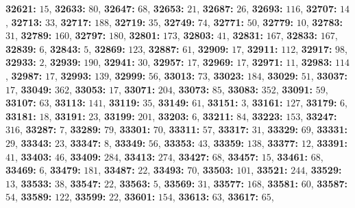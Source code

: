 \textsf{\bfseries 32621:} $15$, \textsf{\bfseries 32633:} $80$, \textsf{\bfseries 32647:} $68$, \textsf{\bfseries 32653:} $21$, \textsf{\bfseries 32687:} $26$, \textsf{\bfseries 32693:} $116$, \textsf{\bfseries 32707:} $14$, \textsf{\bfseries 32713:} $33$, \textsf{\bfseries 32717:} $188$, \textsf{\bfseries 32719:} $35$, \textsf{\bfseries 32749:} $74$, \textsf{\bfseries 32771:} $50$, \textsf{\bfseries 32779:} $10$, \textsf{\bfseries 32783:} $31$, \textsf{\bfseries 32789:} $160$, \textsf{\bfseries 32797:} $180$, \textsf{\bfseries 32801:} $173$, \textsf{\bfseries 32803:} $41$, \textsf{\bfseries 32831:} $167$, \textsf{\bfseries 32833:} $167$, \textsf{\bfseries 32839:} $6$, \textsf{\bfseries 32843:} $5$, \textsf{\bfseries 32869:} $123$, \textsf{\bfseries 32887:} $61$, \textsf{\bfseries 32909:} $17$, \textsf{\bfseries 32911:} $112$, \textsf{\bfseries 32917:} $98$, \textsf{\bfseries 32933:} $2$, \textsf{\bfseries 32939:} $190$, \textsf{\bfseries 32941:} $30$, \textsf{\bfseries 32957:} $17$, \textsf{\bfseries 32969:} $17$, \textsf{\bfseries 32971:} $11$, \textsf{\bfseries 32983:} $114$, \textsf{\bfseries 32987:} $17$, \textsf{\bfseries 32993:} $139$, \textsf{\bfseries 32999:} $56$, \textsf{\bfseries 33013:} $73$, \textsf{\bfseries 33023:} $184$, \textsf{\bfseries 33029:} $51$, \textsf{\bfseries 33037:} $17$, \textsf{\bfseries 33049:} $362$, \textsf{\bfseries 33053:} $17$, \textsf{\bfseries 33071:} $204$, \textsf{\bfseries 33073:} $85$, \textsf{\bfseries 33083:} $352$, \textsf{\bfseries 33091:} $59$, \textsf{\bfseries 33107:} $63$, \textsf{\bfseries 33113:} $141$, \textsf{\bfseries 33119:} $35$, \textsf{\bfseries 33149:} $61$, \textsf{\bfseries 33151:} $3$, \textsf{\bfseries 33161:} $127$, \textsf{\bfseries 33179:} $6$, \textsf{\bfseries 33181:} $18$, \textsf{\bfseries 33191:} $23$, \textsf{\bfseries 33199:} $201$, \textsf{\bfseries 33203:} $6$, \textsf{\bfseries 33211:} $84$, \textsf{\bfseries 33223:} $153$, \textsf{\bfseries 33247:} $316$, \textsf{\bfseries 33287:} $7$, \textsf{\bfseries 33289:} $79$, \textsf{\bfseries 33301:} $70$, \textsf{\bfseries 33311:} $57$, \textsf{\bfseries 33317:} $31$, \textsf{\bfseries 33329:} $69$, \textsf{\bfseries 33331:} $29$, \textsf{\bfseries 33343:} $23$, \textsf{\bfseries 33347:} $8$, \textsf{\bfseries 33349:} $56$, \textsf{\bfseries 33353:} $43$, \textsf{\bfseries 33359:} $138$, \textsf{\bfseries 33377:} $12$, \textsf{\bfseries 33391:} $41$, \textsf{\bfseries 33403:} $46$, \textsf{\bfseries 33409:} $284$, \textsf{\bfseries 33413:} $274$, \textsf{\bfseries 33427:} $68$, \textsf{\bfseries 33457:} $15$, \textsf{\bfseries 33461:} $68$, \textsf{\bfseries 33469:} $6$, \textsf{\bfseries 33479:} $181$, \textsf{\bfseries 33487:} $22$, \textsf{\bfseries 33493:} $70$, \textsf{\bfseries 33503:} $101$, \textsf{\bfseries 33521:} $244$, \textsf{\bfseries 33529:} $13$, \textsf{\bfseries 33533:} $38$, \textsf{\bfseries 33547:} $22$, \textsf{\bfseries 33563:} $5$, \textsf{\bfseries 33569:} $31$, \textsf{\bfseries 33577:} $168$, \textsf{\bfseries 33581:} $60$, \textsf{\bfseries 33587:} $54$, \textsf{\bfseries 33589:} $122$, \textsf{\bfseries 33599:} $22$, \textsf{\bfseries 33601:} $154$, \textsf{\bfseries 33613:} $63$, \textsf{\bfseries 33617:} $65$, 
